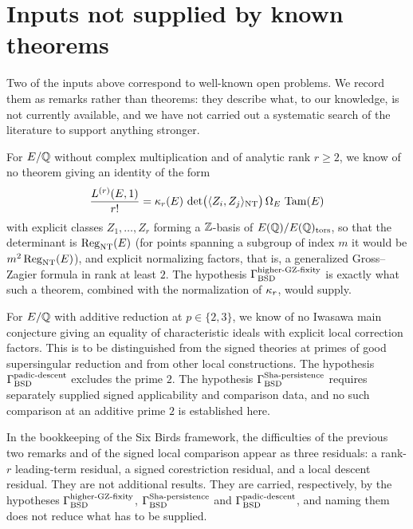 \section{Inputs not supplied by known theorems}
\label{sec:obstructions}

Two of the inputs above correspond to well-known open problems.  We record
them as remarks rather than theorems: they describe what, to our
knowledge, is not currently available, and we have not carried out a
systematic search of the literature to support anything stronger.

\begin{remark}\label{rmk:closure:t-e12-gap}
For $E/\mathbb{Q}$ without complex multiplication and of analytic rank $r\ge2$,
we know of no theorem giving an identity of the form
\[
  \frac{L^{(r)}(E,1)}{r!}
  =
  \kappa_r(E)\,\det\bigl(\langle Z_i,Z_j\rangle_{\mathrm{NT}}\bigr)\,
  \Omega_E\,\operatorname{Tam}(E)
\]
with explicit classes $Z_1,\dots,Z_r$ forming a $\mathbb{Z}$-basis of
$E(\mathbb{Q})/E(\mathbb{Q})_{\operatorname{tors}}$, so that the determinant is $\operatorname{Reg}_{\mathrm{NT}}(E)$
(for points spanning a subgroup of index $m$ it would be
$m^2\operatorname{Reg}_{\mathrm{NT}}(E)$), and explicit normalizing factors, that is, a generalized Gross--Zagier formula in rank at least $2$.  The
hypothesis $\Gamma_{\mathrm{BSD}}^{\mathrm{higher\text{-}GZ\text{-}fixity}}$ is exactly what such a theorem, combined with the
normalization of $\kappa_r$, would supply.
\end{remark}

\begin{remark}\label{rmk:closure:t-bad-gap}
For $E/\mathbb{Q}$ with additive reduction at $p\in\{2,3\}$, we know of no
Iwasawa main conjecture giving an equality of characteristic ideals with
explicit local correction factors.  This is to be distinguished from the
signed theories at primes of good supersingular reduction and from other
local constructions.  The hypothesis $\Gamma_{\mathrm{BSD}}^{\mathrm{padic\text{-}descent}}$ excludes the prime $2$.  The
hypothesis $\Gamma_{\mathrm{BSD}}^{\mathrm{Sha\text{-}persistence}}$ requires separately supplied signed applicability
and comparison data, and no such comparison at an additive prime $2$ is
established here.
\end{remark}

\begin{remark}\label{rmk:closure:mode-b-residuals}
In the bookkeeping of the Six Birds framework, the difficulties of the
previous two remarks and of the signed local comparison appear as three
residuals: a rank-$r$ leading-term residual, a signed corestriction
residual, and a local descent residual.  They are not additional results.
They are carried, respectively, by the hypotheses $\Gamma_{\mathrm{BSD}}^{\mathrm{higher\text{-}GZ\text{-}fixity}}$, $\Gamma_{\mathrm{BSD}}^{\mathrm{Sha\text{-}persistence}}$
and $\Gamma_{\mathrm{BSD}}^{\mathrm{padic\text{-}descent}}$, and naming them does not reduce what has to be supplied.
\end{remark}
